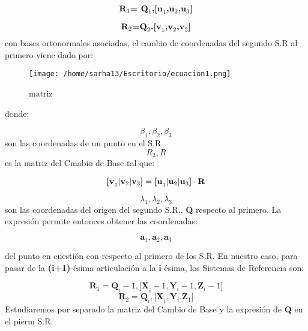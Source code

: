 \documentclass[letter,openright,12pt,spanish]{report}
\begin{document}
\begin{displaymath}
\textbf{R}_1\textbf{= Q}_1 \textbf{,[u}_1\textbf{,u}_2\textbf{,u}_3\textbf{]}\\
\end{displaymath}

\begin{displaymath}
\textbf{R}_2\textbf{=Q}_2\textbf{.[v}_1\textbf{,v}_2\textbf{,v}_3\textbf{]}\\
\end{displaymath}
con bases ortonormales asociadas, el cambio de coordenadas del segundo S.R al primero viene dado por:

\begin{figure}[htp]
\centering
\texttt{[image: /home/sarha13/Escritorio/ecuacion1.png]}
\caption{matriz}
\label{Figura 4.}
\end{figure}
donde:

\begin{displaymath}
\beta_1, \beta_2, \beta_3
\end{displaymath}
son las coordenadas de un punto en el S.R \textbf{\begin{displaymath}R_2, R\end{displaymath}}
es la matriz del Cmabio de Base tal que:

\begin{displaymath}
\textbf{[v}_1|\textbf{v}_2|\textbf{v}_3\textbf{]} = \textbf{[u}_1|\textbf{u}_2|\textbf{u}_3\textbf{]}\cdot\textbf{R}\\
\end{displaymath}

\begin{displaymath} 
\textbf{$\lambda$}_1,\textbf{$\lambda$}_2, \textbf{$\lambda$}_3
\end{displaymath}
son las coordenadas del origen del segundo S.R., \textbf{Q} respecto al primero. La expresi\'on permite entonces obtener las coordenadas:

\begin{displaymath}
\textbf{a}_1, \textbf{a}_2, \textbf{a}_3
\end{displaymath}

del punto en cuesti\'on con respecto al primero de los S.R.
En nuestro caso, para pasar de la \textbf{(i+1)}-\'esima articulaci\'on a la \textbf{i}-\'esima, los Sistemas de Referencia son:

\begin{displaymath}
\textbf{R}_1={\textbf{Q}_i-1,\textbf{[X}_i-1, \textbf{Y}_i-1, \textbf{Z}_i-1 \textbf{]}}
\end{displaymath}
\begin{displaymath}
\textbf{R}_2={\textbf{Q}_i,\textbf{[X}_i,\textbf{Y}_i.\textbf{Z}_1\textbf{]}}
\end{displaymath}
Estudiaremos por separado la matriz del Cambio de Base y la expresi\'on de \textbf{Q} en el pierm S.R.
\end{document}
